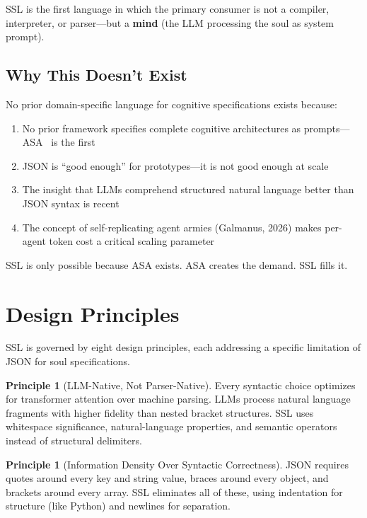 \documentclass[12pt,a4paper]{article}
\theoremstyle{plain}
\theoremstyle{definition}
\newtheorem{principle}[theorem]{Principle}
\theoremstyle{remark}
\begin{document}
SSL is the first language in which the primary consumer is not a compiler, interpreter, or parser---but a \textbf{mind} (the LLM processing the soul as system prompt).

\subsection{Why This Doesn't Exist}

No prior domain-specific language for cognitive specifications exists because:

\begin{enumerate}[nosep]
\item No prior framework specifies complete cognitive architectures as prompts---ASA~\cite{galmanus2026a} is the first
\item JSON is ``good enough'' for prototypes---it is not good enough at scale
\item The insight that LLMs comprehend structured natural language better than JSON syntax is recent
\item The concept of self-replicating agent armies (Galmanus, 2026) makes per-agent token cost a critical scaling parameter
\end{enumerate}

SSL is only possible because ASA exists. ASA creates the demand. SSL fills it.

\section{Design Principles}

SSL is governed by eight design principles, each addressing a specific limitation of JSON for soul specifications.

\begin{principle}[LLM-Native, Not Parser-Native]
Every syntactic choice optimizes for transformer attention over machine parsing. LLMs process natural language fragments with higher fidelity than nested bracket structures. SSL uses whitespace significance, natural-language properties, and semantic operators instead of structural delimiters.
\end{principle}

\begin{principle}[Information Density Over Syntactic Correctness]
JSON requires quotes around every key and string value, braces around every object, and brackets around every array. SSL eliminates all of these, using indentation for structure (like Python) and newlines for separation.
\end{principle}
\end{document}
